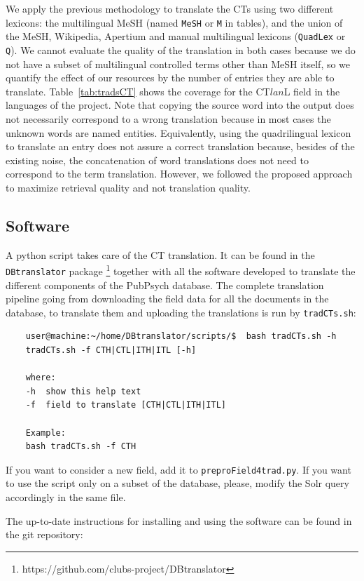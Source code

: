 \documentclass[a4paper,11pt]{article}
\begin{document}
	\bigskip
	We apply the previous methodology to translate the CTs using two different lexicons: the multilingual MeSH (named {\tt MeSH} or {\tt M} in tables), and the union of the MeSH, Wikipedia, Apertium and manual multilingual lexicons ({\tt QuadLex} or {\tt Q}). We cannot evaluate the quality of the translation in both cases because we do not have a subset of multilingual controlled terms other than MeSH itself, so we quantify the effect of our resources by the number of entries they are able to translate. Table~\ref{tab:tradsCT} shows the coverage for the CT$lan$L field in the languages of the project. Note that copying the source word into the output does not necessarily correspond to a wrong translation because in most cases the unknown words are named entities. Equivalently, using the quadrilingual lexicon to translate an entry does not assure a correct translation because, besides of the existing noise, the concatenation of word translations does not need to correspond to the term translation. However, we followed the proposed approach to maximize retrieval quality and not translation quality. 
	
	\subsection{Software}
	
	A python script takes care of the CT translation. It can be found in the {\tt DBtranslator} package%
	\footnote{\url{}https://github.com/clubs-project/DBtranslator}
	together with all the software developed to translate the different components of the PubPsych database.
	The complete translation pipeline going from downloading the field data for all the documents in the database, to translate them and uploading the translations is run by {\tt tradCTs.sh}:
	
	\begin{verbatim}
	user@machine:~/home/DBtranslator/scripts/$  bash tradCTs.sh -h
	tradCTs.sh -f CTH|CTL|ITH|ITL [-h] 
	
	where:
	-h  show this help text
	-f  field to translate [CTH|CTL|ITH|ITL]
	
	Example:
	bash tradCTs.sh -f CTH
	\end{verbatim}
	
	If you want to consider a new field, add it to {\tt preproField4trad.py}. If you want to use the script only on a subset of the database, please, modify the Solr query accordingly in the same file. 
	
	The up-to-date instructions for installing and using the software can be found in the git repository:
	
\end{document}
